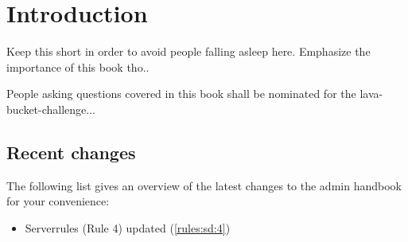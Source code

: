 \chapter{Introduction}
Keep this short in order to avoid people falling asleep here.
Emphasize the importance of this book tho..


People asking questions covered in this book shall be nominated for the lava-bucket-challenge...

\section{Recent changes}
The following list gives an overview of the latest changes to the admin handbook for your convenience:
\begin{itemize}
  \item Serverrules (Rule 4) updated (\ref{rules:sd:4})
\end{itemize}